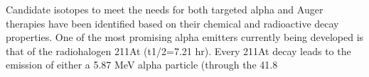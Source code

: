 Candidate isotopes to meet the needs for both targeted alpha and Auger therapies have been identified based on their chemical and radioactive decay properties. One of the most promising alpha emitters currently being developed is that of the radiohalogen 211At (t1/2=7.21 hr). Every 211At decay leads to the emission of either a 5.87 MeV alpha particle (through the 41.8%

